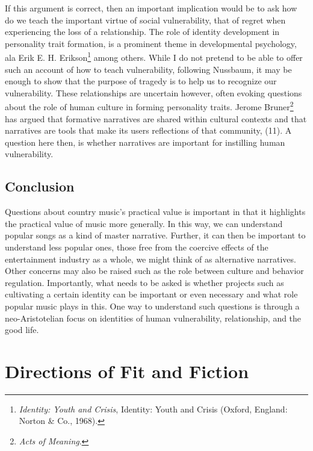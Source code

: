 \documentclass[phdthesis,12pt,final]{wuthesis}
\theoremstyle{definition}
\theoremstyle{definition}
\theoremstyle{definition}
\theoremstyle{definition}
\theoremstyle{remark}
\begin{document}
If this argument is correct, then an important implication would be to ask how do we teach the important virtue of social vulnerability, that of regret when experiencing the loss of a relationship. The role of identity development in personality trait formation, is a prominent theme in developmental psychology, ala Erik E. H. Erikson\footnote{\emph{Identity: Youth and Crisis}, Identity: Youth and Crisis (Oxford, England: Norton \& Co., 1968).} among others. While I do not pretend to be able to offer such an account of how to teach vulnerability, following Nussbaum, it may be enough to show that the purpose of tragedy is to help us to recognize our vulnerability. These relationships are uncertain however, often evoking questions about the role of human culture in forming personality traits. Jerome Bruner\footnote{\emph{Acts of Meaning}.} has argued that formative narratives are shared within cultural contexts and that narratives are tools that make its users reflections of that community, (11). A question here then, is whether narratives are important for instilling human vulnerability.

\section{Conclusion}\label{conclusion}

Questions about country music's practical value is important in that it highlights the practical value of music more generally. In this way, we can understand popular songs as a kind of master narrative. Further, it can then be important to understand less popular ones, those free from the coercive effects of the entertainment industry as a whole, we might think of as alternative narratives. Other concerns may also be raised such as the role between culture and behavior regulation. Importantly, what needs to be asked is whether projects such as cultivating a certain identity can be important or even necessary and what role popular music plays in this. One way to understand such questions is through a neo-Aristotelian focus on identities of human vulnerability, relationship, and the good life.

\chapter{Directions of Fit and Fiction}\label{directions-of-fit-and-fiction}
\end{document}
